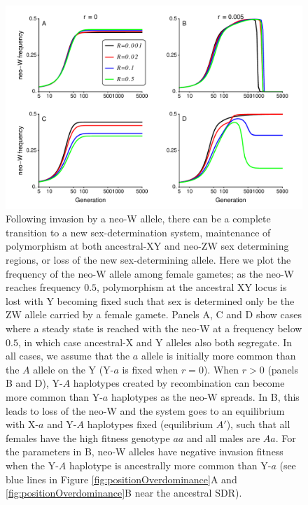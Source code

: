 \documentclass[12pt]{article}
\begin{document}
\newpage

\begin{figure}[!h]
\centering
\centerline{\includegraphics[width=\linewidth]{Temporal_Overdominance}}
\caption{
Following invasion by a neo-W allele, there can be a complete transition to a new sex-determination system, maintenance of polymorphism at both ancestral-XY and neo-ZW sex determining regions, or loss of the new sex-determining allele. 
Here we plot the frequency of the neo-W allele among female gametes; as the neo-W reaches frequency $0.5$, polymorphism at the ancestral XY locus is lost with Y becoming fixed such that sex is determined only be the ZW allele carried by a female gamete. 
Panels A, C and D show cases where a steady state is reached with the neo-W at a frequency below $0.5$, in which case ancestral-X and Y alleles also both segregate. 
In all cases, we assume that the $a$ allele is initially more common than the $A$ allele on the Y (Y-$a$ is fixed when $r=0$). 
When $r>0$ (panels B and D), Y-$A$ haplotypes created by recombination can become more common than Y-$a$ haplotypes as the neo-W spreads.
In B, this leads to loss of the neo-W and the system goes to an equilibrium with X-$a$ and Y-$A$ haplotypes fixed (equilibrium $A'$), such that all females have the high fitness genotype $aa$ and all males are $Aa$. 
For the parameters in B, neo-W alleles have negative invasion fitness when the Y-$A$ haplotype is ancestrally more common than Y-$a$ (see blue lines in Figure \ref{fig:positionOverdominance}A and  \ref{fig:positionOverdominance}B near the ancestral SDR). 
}
\end{figure}
\end{document}
